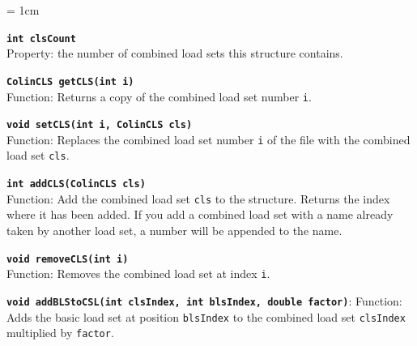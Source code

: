\begin{trivlist}
		\begin{trivlist}
		\leftskip = 1cm
		\item[] \textbf{\texttt{int clsCount}}\\ Property: the number of combined load sets this structure contains. 
		\item[] \textbf{\texttt{ColinCLS getCLS(int i)}}\\ Function: Returns a copy of the combined load set number \texttt{i}.
		\item[] \textbf{\texttt{void setCLS(int i, ColinCLS cls)}}\\ Function: Replaces the combined load set number \texttt{i} of the file with the combined load set \texttt{cls}.
		\item[] \textbf{\texttt{int addCLS(ColinCLS cls)}}\\ Function: Add the combined load set \texttt{cls} to the structure. Returns the index where it has been added. If you add a combined load set with a name already taken by another load set, a number will be appended to the name.
		\item[] \textbf{\texttt{void removeCLS(int i)}}\\ Function: Removes the combined load set at index \texttt{i}.
		\item[] \textbf{\texttt{void addBLStoCSL(int clsIndex, int blsIndex, double factor)}}: Function: Adds the basic load set at position \texttt{blsIndex} to the combined load set \texttt{clsIndex} multiplied by \texttt{factor}.
	\end{trivlist}
\end{trivlist}

